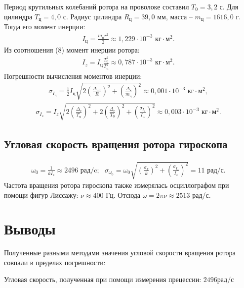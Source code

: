 \documentclass[a4paper]{article}
\begin{document}
Период крутильных колебаний ротора на проволоке составил $T_0 = 3,2$ с. Для цилиндра $T_\text{ц} = 4,0$ с. Радиус цилиндра $R_\text{ц} = 39,0$ мм, масса -- $m_\text{ц} = 1616,0$ г. Тогда его момент инерции:
\[
\begin{gathered}
I_\text{ц} = \frac{m_\text{ц} r^2}{2} \approx 1,229 \cdot 10^{-3} \text{ кг} \cdot \text{м}^2.
\end{gathered}
\]
Из соотношения (8) момент инерции ротора:
\[
\begin{gathered}
I_z = I_\text{ц} \frac{T_0^2}{T_\text{ц}^2} \approx 0,787  \cdot 10^{-3} \text{ кг} \cdot \text{м}^2.
\end{gathered}
\]
Погрешности вычисления моментов инерции:
\[
\begin{gathered}
\sigma_{I_{\text{ц}}} = \frac{1}{2} I_{\text{ц}} \sqrt{2(\frac{\Delta_{\text{шт}}}{R})^2 + (\frac{\Delta_{\text{в}}}{m_{\text{ц}}})^2} \approx 0,001 \cdot 10^{-3}  \text{ кг} \cdot \text{м}^2,
\end{gathered}
\]
\[
\begin{gathered}
\sigma_{I_{z}} = I_{z} \sqrt{2(\frac{\Delta_{c}}{T_{\mathrm{ц}}})^{2} + 2(\frac{\Delta_{c}}{T_{0}})^{2} + (\frac{\sigma_{I_{\mathrm{ц}}}}{I_{\mathrm{ц}}})^{2}} \approx 0,003 \cdot 10^{-3}  \text{ кг} \cdot \text{м}^2.
\end{gathered}
\]

\subsection{Угловая скорость вращения ротора гироскопа}

\[
\begin{gathered}
\omega_0 = \frac{1}{kI_z} \approx 2496 \text{ рад/c}; \text{ } \sigma_{\omega_{0}} = \omega_{0} \sqrt{(\frac{\sigma_{k}}{k})^{2} + (\frac{\sigma_{I_{z}}}{I_{z}})^{2}} = 11 \text{ рад/с}.
\end{gathered}
\]
Частота вращения ротора гироскопа также измерялась осциллографом при помощи фигур Лиссажу: $\nu \approx 400$ Гц. Отсюда $\omega = 2 \pi \nu \approx 2513$ рад/с.

\section{Выводы}

Полученные разными методами значения угловой скорости вращения ротора совпали в пределах погрешности:

Угловая скорость, полученная при помощи измерения прецессии: $2496 рад/с$
\end{document}
